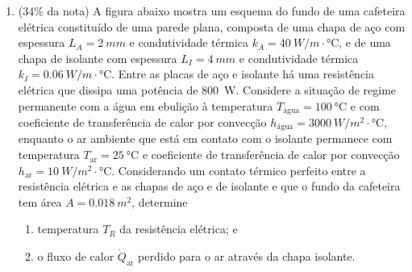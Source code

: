 \documentclass[12pt,a4paper,brazilian]{article}
\newcommand{\ratio}[1]{(#1\% da nota)}
\def\Description{Fenômenos de Transporte -- Prova 3}
\begin{document}
\begin{enumerate}
    \item \ratio{34} A figura abaixo mostra um esquema do fundo de uma cafeteira 
        elétrica constituído de uma parede plana, composta de uma chapa de aço com
        espessura \(L_A = \SI{2}{mm}\) e condutividade térmica \(k_A = \SI{40}{W/m\cdot\celsius}\),
        e de uma chapa de isolante com espessura \(L_I = \SI{4}{mm}\) e condutividade térmica
        \(k_I = \SI{0.06}{W/m\cdot\celsius}\). Entre as placas de aço e isolante há uma resistência 
        elétrica que dissipa uma potência de \SI{800}{W}. Considere a situação de regime
        permanente com a água em ebulição à temperatura \(T_\text{água}= \SI{100}{\celsius}\) e
        com coeficiente de transferência de calor por convecção \(h_\text{água}=\SI{3000}{W/{m^2}\cdot\celsius}\),
        enquanto o ar ambiente que está em contato com o isolante permanece com temperatura
        \(T_\text{ar} = \SI{25}{\celsius}\) e coeficiente de transferência de calor por
        convecção \(h_\text{ar} = \SI{10}{W/{m^2}\cdot\celsius} \). Considerando um contato térmico 
        perfeito entre a resistência elétrica e as chapas de aço e de isolante e que o fundo da cafeteira
        tem área \(A=\SI{0.018}{m^2}\), determine
        \begin{enumerate}
            \item temperatura \(T_R\) da resistência elétrica; e
            \item o fluxo de calor \(\dot{Q}_\text{ar}\) perdido para o ar através da chapa
                isolante.

        \end{enumerate}

        \centering
\end{enumerate}

\newpage

\def\Description{Fenômenos de Transporte -- Gabarito}
\end{document}
